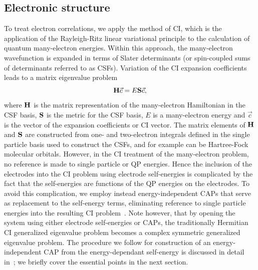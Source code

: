 \subsection{Electronic structure}
To treat electron correlations, we apply the method of \ac{CI}, which is
the application of the  Rayleigh-Ritz linear variational
principle to the calculation of quantum many-electron  energies. Within
this approach, the many-electron wavefunction is expanded in terms  of
Slater determinants (or spin-coupled sums of determinants referred to as
\acp{CSF}).  Variation of the \ac{CI} expansion coefficients leads to a
matrix eigenvalue problem
\begin{equation}
\mathbf{H} \vec{c} = E \mathbf{S} \vec{c},
\end{equation} 
where $\mathbf{H}$ is the matrix representation of the many-electron
Hamiltonian in the CSF basis, $\mathbf{S}$ is the metric for the CSF basis,
$E$ is a many-electron energy and $\vec{c}$ is the vector of the
expansion coefficients or CI vector. The matrix elements of $\mathbf{H}$
and $\mathbf{S}$ are constructed from one- and two-electron integrals
defined in the single particle basis used to construct the CSFs, and for
example can be Hartree-Fock molecular orbitals. However, in the CI treatment
of the many-electron problem, no reference is made to single particle or
\ac{QP} energies. Hence the inclusion of the electrodes into the
CI problem using electrode self-energies is complicated by the fact that
the self-energies are functions of the \ac{QP} energies on the
electrodes. To avoid this complication, we employ instead energy-independent
\acp{CAP} that serve as replacement to the self-energy terms, eliminating
reference to single particle energies into the resulting \ac{CI}
problem~\cite{riss_meyer,santracederbaum,muga2004,henderson,varga2008}.
Note however, that by opening the system using either electrode self-energies
or \acp{CAP},  the traditionally Hermitian \ac{CI} generalized eigenvalue
problem becomes a complex symmetric generalized eigenvalue problem. The
procedure we follow for construction of an energy-independent \ai \ac{CAP} 
from the energy-dependant self-energy is discussed in detail
in~\cite{henderson}; we briefly cover the essential points
in the next section.

